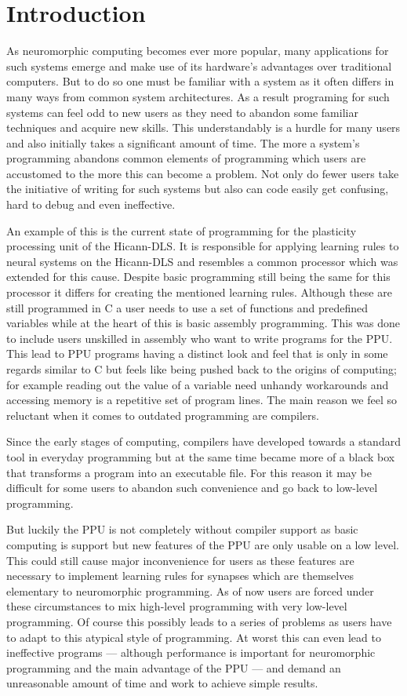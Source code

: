 \chapter{Introduction}
\label{chapter:introduction}

As neuromorphic computing becomes ever more popular, many applications for such systems emerge and make use of its hardware's advantages over traditional computers.
But to do so one must be familiar with a system as it often differs in many ways from common system architectures.
As a result programing for such systems can feel odd to new users as they need to abandon some familiar techniques and acquire new skills.
This understandably is a hurdle for many users and also initially takes a significant amount of time. 
The more a system's programming abandons common elements of programming which users are accustomed to the more this can become a problem.
Not only do fewer users take the initiative of writing for such systems but also can code easily get confusing, hard to debug and even ineffective.

An example of this is the current state of programming for the plasticity processing unit of the Hicann-DLS.
It is responsible for applying learning rules to neural systems on the Hicann-DLS and resembles a common processor which was extended for this cause.
Despite basic programming still being the same for this processor it differs for creating the mentioned learning rules.
Although these are still programmed in C a user needs to use a set of functions and predefined variables while at the heart of this is basic assembly programming.
This was done to include users unskilled in assembly who want to write programs for the PPU.
This lead to PPU programs having a distinct look and feel that is only in some regards similar to C but feels like being pushed back to the origins of computing; for example reading out the value of a variable need unhandy workarounds and accessing memory is a repetitive set of program lines.
The main reason we feel so reluctant when it comes to outdated programming are compilers.

Since the early stages of computing, compilers have developed towards a standard tool in everyday programming but at the same time became more of a black box that transforms a program into an executable file.
For this reason it may be difficult for some users to abandon such convenience and go back to low-level programming.

But luckily the PPU is not completely without compiler support as basic computing is support but new features of the PPU are only usable on a low level.
This could still cause major inconvenience for users as these features are necessary to implement learning rules for synapses which are themselves elementary to neuromorphic programming.
As of now users are forced under these circumstances to mix high-level programming with very low-level programming.
Of course this possibly leads to a series of problems as users have to adapt to this atypical style of programming.
At worst this can even lead to ineffective programs --- although performance is important for neuromorphic programming and the main advantage of the PPU --- and demand an unreasonable amount of time and work to achieve simple results.

